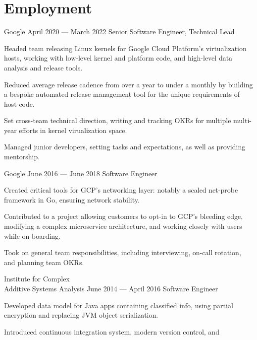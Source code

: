 \documentclass{tc_cv}
\newcommand{\jobSpace}{\vspace{0.75em}}
\begin{document}
\begin{minipage}[t]{0.6\linewidth}
  \section{Employment}
  \begin{job}{Google}
    {April 2020 --- March 2022}
    {Senior Software Engineer, Technical Lead}
    \item Headed team releasing Linux kernels for Google Cloud Platform's
      virtualization hosts, working with low-level kernel and platform code,
      and high-level data analysis and release tools.
    \item Reduced average release cadence from over a year to under a monthly
      by building a bespoke automated release management tool for the unique
      requirements of host-code.
    \item Set cross-team technical direction, writing and tracking OKRs for
      multiple multi-year efforts in kernel virualization space.
    \item Managed junior developers, setting tasks and expectations, as well as
      providing mentorship.
  \end{job}
  \jobSpace
  \begin{job}{Google}
    {June 2016 --- June 2018}
    {Software Engineer}
  \item Created critical tools for GCP's networking layer: notably a scaled
    net-probe framework in Go, ensuring network stability.
  \item Contributed to a project allowing customers to opt-in to GCP's bleeding
    edge, modifying a complex microservice architecture, and working closely
    with users while on-boarding.
  \item Took on general team responsibilities, including interviewing, on-call
    rotation, and planning team OKRs.
  \end{job}
  \jobSpace
  \begin{job}{Institute for Complex \\ Additive Systems Analysis}
    {June 2014 --- April 2016}
    {Software Engineer}
    \item Developed data model for Java apps containing classified info,
      using partial encryption and replacing JVM object serialization.
    \item Introduced continuous integration system, modern version control, and

\end{job}
\end{minipage}
\end{document}
